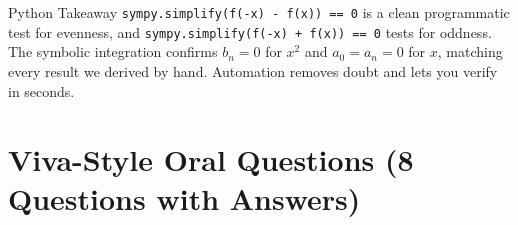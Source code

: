 \documentclass[12pt,a4paper]{article}
\begin{document}
\begin{learnbox}{Python Takeaway}
\texttt{sympy.simplify(f(-x) - f(x)) == 0} is a clean programmatic test for evenness, and
\texttt{sympy.simplify(f(-x) + f(x)) == 0} tests for oddness. The symbolic integration
confirms $b_n = 0$ for $x^2$ and $a_0 = a_n = 0$ for $x$, matching every result we derived
by hand. Automation removes doubt and lets you verify in seconds.
\end{learnbox}

\section{Viva-Style Oral Questions (8 Questions with Answers)}
\end{document}
